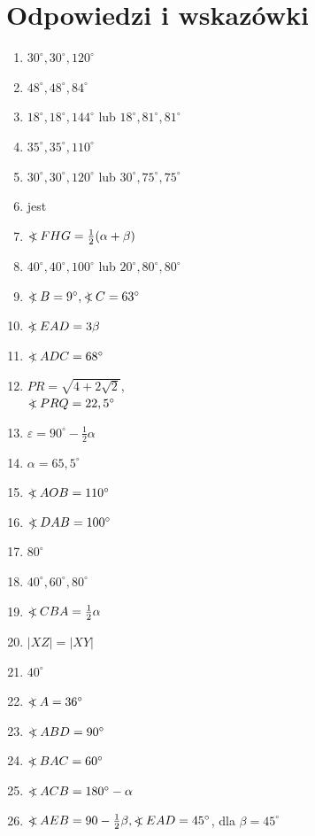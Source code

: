 \documentclass[10pt]{article}
\newcommand\Varangle{\mathop{{<\!\!\!\!\!\text{\small)}}\:}\nolimits}
\begin{document}
\section*{Odpowiedzi i wskazówki}
\begin{enumerate}
  \item \(30^{\circ}, 30^{\circ}, 120^{\circ}\)
  \item \(48^{\circ}, 48^{\circ}, 84^{\circ}\)
  \item \(18^{\circ}, 18^{\circ}, 144^{\circ}\) lub \(18^{\circ}, 81^{\circ}, 81^{\circ}\)
  \item \(35^{\circ}, 35^{\circ}, 110^{\circ}\)
  \item \(30^{\circ}, 30^{\circ}, 120^{\circ}\) lub \(30^{\circ}, 75^{\circ}, 75^{\circ}\)
  \item jest
  \item \(\Varangle F H G=\frac{1}{2}(\alpha+\beta)\)
  \item \(40^{\circ}, 40^{\circ}, 100^{\circ}\) lub \(20^{\circ}, 80^{\circ}, 80^{\circ}\)
  \item \(\Varangle B=9^{\circ}, \Varangle C=63^{\circ}\)
  \item \(\Varangle E A D=3 \beta\)
  \item \(\Varangle A D C=68^{\circ}\)
  \item \(P R=\sqrt{4+2 \sqrt{2}}\),\\
\(\Varangle P R Q=22,5^{\circ}\)
  \item \(\varepsilon=90^{\circ}-\frac{1}{2} \alpha\)
  \item \(\alpha=65,5^{\circ}\)
  \item \(\Varangle A O B=110^{\circ}\)
  \item \(\Varangle D A B=100^{\circ}\)
  \item \(80^{\circ}\)
  \item \(40^{\circ}, 60^{\circ}, 80^{\circ}\)
  \item \(\Varangle C B A=\frac{1}{2} \alpha\)
  \item \(|X Z|=|X Y|\)
  \item \(40^{\circ}\)
  \item \(\Varangle A=36^{\circ}\)
  \item \(\Varangle A B D=90^{\circ}\)
  \item \(\Varangle B A C=60^{\circ}\)
  \item \(\Varangle A C B=180^{\circ}-\alpha\)
  \item \(\Varangle A E B=90-\frac{1}{2} \beta, \Varangle E A D=45^{\circ}\), dla \(\beta=45^{\circ}\)

\end{enumerate}
\end{document}
